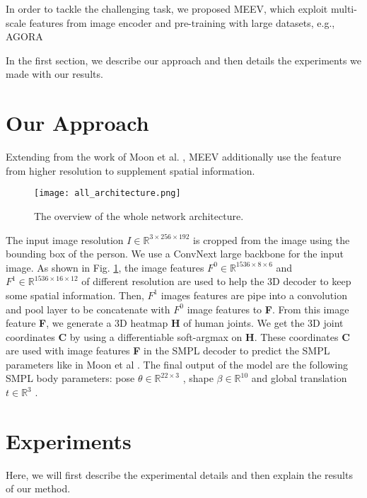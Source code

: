\documentclass[runningheads]{llncs}
\begin{document}
In order to tackle the challenging task, we proposed MEEV, which exploit multi-scale features from image encoder and pre-training with large datasets, e.g., AGORA \cite{Patel:CVPR:2021} 


In the first section, we describe our approach and then details the experiments we made with our results.



\section{Our Approach}
Extending from the work of Moon et al. \cite{Moon_2022_CVPRW_Hand4Whole}, MEEV additionally use the feature from higher resolution to supplement spatial information. 

\begin{figure}[h]
    \centering
    \texttt{[image: all\_architecture.png]}
    \caption{The overview of the whole network architecture.}
    \label{fig:main_model}
\end{figure}

The input image resolution $I \in \mathbb{R}^{3 \times 256 \times 192} $ is cropped from the image using the bounding box of the person.
We use a ConvNext \cite{liu2022convnet} large backbone for the input image.
As shown in Fig. \ref{fig:main_model}, the image features ${F}^0 \in \mathbb{R}^{1536 \times 8 \times 6} $ and ${F}^1  \in \mathbb{R}^{1536 \times 16 \times 12}$
 of different resolution are used to help the 3D decoder to keep some spatial information. Then, 
$F^1$ images features are pipe into a convolution and pool layer to be concatenate with $F^0$ image features to \textbf{F}.
From this image feature \textbf{F}, we generate a 3D heatmap \textbf{H} of human joints. We get the 3D joint coordinates \textbf{C} by using a differentiable soft-argmax on \textbf{H}. 
These coordinates \textbf{C} are used with image features \textbf{F} in the SMPL decoder to predict the SMPL parameters like in Moon et al \cite{Moon_2022_CVPRW_Hand4Whole}.
The final output of the model are the following SMPL \cite{SMPL:2015} body parameters: pose $\theta \in \mathbb{R}^{22 \times 3} $
, shape $\beta \in \mathbb{R}^{10}$ and global translation $t \in \mathbb{R}^{3}$ .


\section{Experiments}
Here, we will first describe the experimental details and then explain the results of our method.
\end{document}
